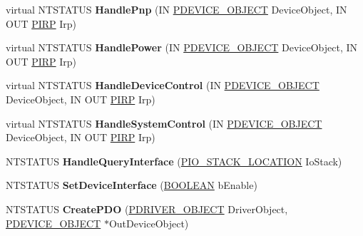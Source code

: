 \begin{DoxyCompactItemize}
virtual N\+T\+S\+T\+A\+T\+US {\bfseries Handle\+Pnp} (IN \hyperlink{struct___d_e_v_i_c_e___o_b_j_e_c_t}{P\+D\+E\+V\+I\+C\+E\+\_\+\+O\+B\+J\+E\+CT} Device\+Object, IN O\+UT \hyperlink{interfacevoid}{P\+I\+RP} Irp)
\item 
\mbox{\label{class_c_hub_controller_ad5cff2ae4d2e1af5ad1cbf951be3fa73}} 
virtual N\+T\+S\+T\+A\+T\+US {\bfseries Handle\+Power} (IN \hyperlink{struct___d_e_v_i_c_e___o_b_j_e_c_t}{P\+D\+E\+V\+I\+C\+E\+\_\+\+O\+B\+J\+E\+CT} Device\+Object, IN O\+UT \hyperlink{interfacevoid}{P\+I\+RP} Irp)
\item 
\mbox{\label{class_c_hub_controller_af158689a102874f38285296b563132cb}} 
virtual N\+T\+S\+T\+A\+T\+US {\bfseries Handle\+Device\+Control} (IN \hyperlink{struct___d_e_v_i_c_e___o_b_j_e_c_t}{P\+D\+E\+V\+I\+C\+E\+\_\+\+O\+B\+J\+E\+CT} Device\+Object, IN O\+UT \hyperlink{interfacevoid}{P\+I\+RP} Irp)
\item 
\mbox{\label{class_c_hub_controller_a5b359adb732f52e8d900b0d011971471}} 
virtual N\+T\+S\+T\+A\+T\+US {\bfseries Handle\+System\+Control} (IN \hyperlink{struct___d_e_v_i_c_e___o_b_j_e_c_t}{P\+D\+E\+V\+I\+C\+E\+\_\+\+O\+B\+J\+E\+CT} Device\+Object, IN O\+UT \hyperlink{interfacevoid}{P\+I\+RP} Irp)
\item 
\mbox{\label{class_c_hub_controller_ada433f606a4fb1d3b3969ba0f1e7b2f6}} 
N\+T\+S\+T\+A\+T\+US {\bfseries Handle\+Query\+Interface} (\hyperlink{struct___i_o___s_t_a_c_k___l_o_c_a_t_i_o_n}{P\+I\+O\+\_\+\+S\+T\+A\+C\+K\+\_\+\+L\+O\+C\+A\+T\+I\+ON} Io\+Stack)
\item 
\mbox{\label{class_c_hub_controller_ae0859b72a001fb9d7d05d545e6d786eb}} 
N\+T\+S\+T\+A\+T\+US {\bfseries Set\+Device\+Interface} (\hyperlink{_processor_bind_8h_a112e3146cb38b6ee95e64d85842e380a}{B\+O\+O\+L\+E\+AN} b\+Enable)
\item 
\mbox{\label{class_c_hub_controller_ad7a432859d858c18fb880c4e08e5b7f2}} 
N\+T\+S\+T\+A\+T\+US {\bfseries Create\+P\+DO} (\hyperlink{struct___d_r_i_v_e_r___o_b_j_e_c_t}{P\+D\+R\+I\+V\+E\+R\+\_\+\+O\+B\+J\+E\+CT} Driver\+Object, \hyperlink{struct___d_e_v_i_c_e___o_b_j_e_c_t}{P\+D\+E\+V\+I\+C\+E\+\_\+\+O\+B\+J\+E\+CT} $\ast$Out\+Device\+Object)

\end{DoxyCompactItemize}
